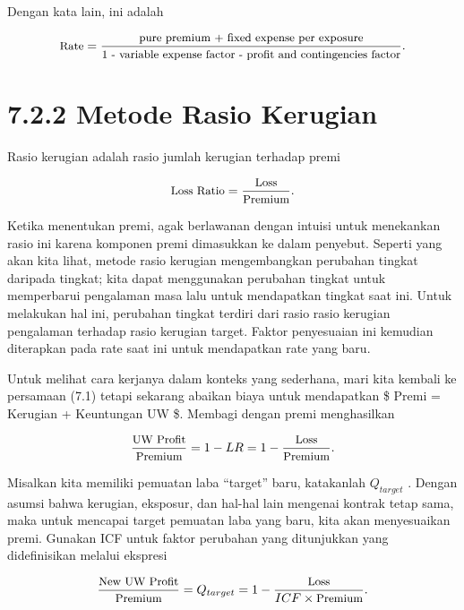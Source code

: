 \documentclass[
]{book}
\begin{document}
Dengan kata lain, ini adalah

\begin{equation}
\small{
\text{Rate} =\frac{\text{pure premium + fixed expense per exposure}}{\text{1 - variable expense factor - profit and contingencies factor}}  .
}
\end{equation}

\hypertarget{metode-rasio-kerugian}{%
\section{7.2.2 Metode Rasio Kerugian}\label{metode-rasio-kerugian}}

Rasio kerugian adalah rasio jumlah kerugian terhadap premi

\begin{equation}
\small{
\text{Loss Ratio} = \frac{\text{Loss}}{\text{Premium}} .
}
\end{equation}

Ketika menentukan premi, agak berlawanan dengan intuisi untuk menekankan rasio ini karena komponen premi dimasukkan ke dalam penyebut. Seperti yang akan kita lihat, metode rasio kerugian mengembangkan perubahan tingkat daripada tingkat; kita dapat menggunakan perubahan tingkat untuk memperbarui pengalaman masa lalu untuk mendapatkan tingkat saat ini. Untuk melakukan hal ini, perubahan tingkat terdiri dari rasio rasio kerugian pengalaman terhadap rasio kerugian target. Faktor penyesuaian ini kemudian diterapkan pada rate saat ini untuk mendapatkan rate yang baru.

Untuk melihat cara kerjanya dalam konteks yang sederhana, mari kita kembali ke persamaan (7.1) tetapi sekarang abaikan biaya untuk mendapatkan \$ Premi = Kerugian + Keuntungan UW \$. Membagi dengan premi menghasilkan

\begin{equation}
\small{
\frac{\text{UW Profit}}{\text{Premium}} = 1 - LR = 1 - \frac{\text{Loss}}{\text{Premium}} .
}
\end{equation}

Misalkan kita memiliki pemuatan laba ``target'' baru, katakanlah \(Q_{target}\) . Dengan asumsi bahwa kerugian, eksposur, dan hal-hal lain mengenai kontrak tetap sama, maka untuk mencapai target pemuatan laba yang baru, kita akan menyesuaikan premi. Gunakan ICF untuk faktor perubahan yang ditunjukkan yang didefinisikan melalui ekspresi

\begin{equation}
\small{
\frac{\text{New UW Profit}}{\text{Premium}} = Q_{target} =  1 - \frac{\text{Loss}}{ICF \times \text{Premium}}.
}
\end{equation}
\end{document}
